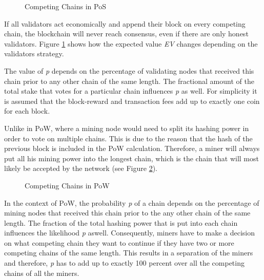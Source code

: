 \begin{figure}[H]
	\begin{center}
		
	\end{center}
	\caption{Competing Chains in PoS \cite{ethereum_faq}}
	\label{pos_competing_chains}
\end{figure}

If all validators act economically and append their block on every competing chain, the blockchain will never reach consensus, even if there are only honest validators. Figure \ref{pos_competing_chains} shows how the expected value \textit{EV} changes depending on the validators strategy. 

The value of \textit{p} depends on the percentage of validating nodes that received this chain prior to any other chain of the same length. The fractional amount of the total stake that votes for a particular chain influences \textit{p} as well. For simplicity it is assumed that the block-reward and transaction fees add up to exactly one coin for each block.

Unlike in PoW, where a mining node would need to split its hashing power in order to vote on multiple chains. This is due to the reason that the hash of the previous block is included in the PoW calculation. Therefore, a miner will always put all his mining power into the longest chain, which is the chain that will most likely be accepted by the network (see Figure \ref{pow_competing_chains}). 

\begin{figure}[H]
	\begin{center}
		
	\end{center}
	\caption{Competing Chains in PoW \cite{ethereum_faq}}
	\label{pow_competing_chains}
\end{figure}

In the context of PoW, the probability \textit{p} of a chain depends on the percentage of mining nodes that received this chain prior to the any other chain of the same length. The fraction of the total hashing power that is put into each chain influences the likelihood \textit{p} aswell. 
Consequently, miners have to make a decision on what competing chain they want to continue if they have two or more competing chains of the same length. This results in a separation of the miners and therefore, \textit{p} has to add up to exactly 100 percent over all the competing chains of all the miners. 

